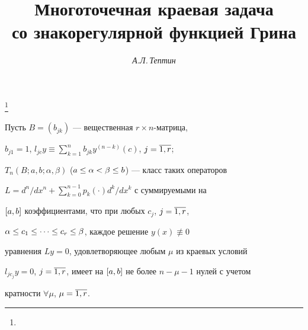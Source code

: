 










\author{\it А.Л.\,Тептин}




\title{Многоточечная краевая задача\\ со знакорегулярной функцией Грина}


\thanks{}





\date{}




\pagestyle{plain} %







\maketitle


\label{begin}








Пусть $B=(b_{jk})$ --- вещественная $r\times n$-матрица,


$b_{j1}=1$, $l_{jc}y\equiv\sum\limits^n_{k=1}b_{jk}y^{(n-k)}(c)$, $j=\overline{1,r}$;


$T_n(B;a,b;\alpha,\beta)$ ($a\le\alpha<\beta\le b$) --- класс таких операторов


$L=d^n/dx^n+\sum\limits^{n-1}_{k=0}p_k(\cdot)d^k/dx^k$ с суммируемыми на


$[a,b]$ коэффициентами, что при любых $c_j$, $j=\overline{1,r}$,


$\alpha\le c_1\le \dotsb\le c_r\le\beta$, каждое решение $y(x)\not\equiv 0$


уравнения $Ly=0$, удовлетворяющее любым $\mu$ из краевых условий


$l_{jc_j}y=0$, $j=\overline{1,r}$, имеет на $[a,b]$ не более $n-\mu-1$ нулей с учетом


кратности $\forall \mu$, $\mu=\overline{1,r}$.





